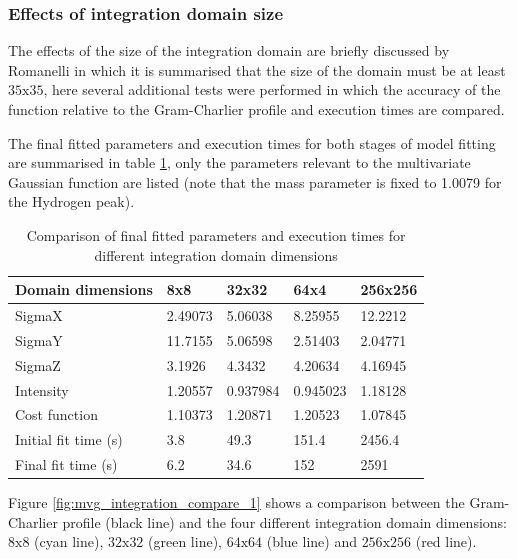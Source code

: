 \documentclass[a4paper]{article}
\begin{document}
\subsubsection{Effects of integration domain size}
\label{sec:mvg_testing_integration_domain}

The effects of the size of the integration domain are briefly discussed by
Romanelli in which it is summarised that the size of the domain must be at least
$\mathrm{35x35}$, here several additional tests were performed in which the
accuracy of the function relative to the Gram-Charlier profile and execution
times are compared.

The final fitted parameters and execution times for both stages of model fitting
are summarised in table \ref{tab:mvg_integration_compare_params}, only the
parameters relevant to the multivariate Gaussian function are listed (note that
the mass parameter is fixed to 1.0079 for the Hydrogen peak).

\begin{table}[h!]
  \centering
  \begin{tabular}{@{}lllll@{}}
    \toprule
    Domain dimensions    & 8x8     & 32x32    & 64x4     & 256x256 \\
    \midrule
    SigmaX               & 2.49073 & 5.06038  & 8.25955  & 12.2212 \\
    SigmaY               & 11.7155 & 5.06598  & 2.51403  & 2.04771 \\
    SigmaZ               & 3.1926  & 4.3432   & 4.20634  & 4.16945 \\
    Intensity            & 1.20557 & 0.937984 & 0.945023 & 1.18128 \\
    Cost function        & 1.10373 & 1.20871  & 1.20523  & 1.07845 \\
    Initial fit time (s) & 3.8     & 49.3     & 151.4    & 2456.4  \\
    Final fit time (s)   & 6.2     & 34.6     & 152      & 2591    \\
    \bottomrule
  \end{tabular}
  \caption{Comparison of final fitted parameters and execution times for
           different integration domain dimensions}
  \label{tab:mvg_integration_compare_params}
\end{table}
\FloatBarrier

Figure \ref{fig:mvg_integration_compare_1} shows a comparison between the
Gram-Charlier profile (black line) and the four different integration domain
dimensions: $\mathrm{8x8}$ (cyan line), $\mathrm{32x32}$ (green line),
$\mathrm{64x64}$ (blue line) and $\mathrm{256x256}$ (red line).
\end{document}
